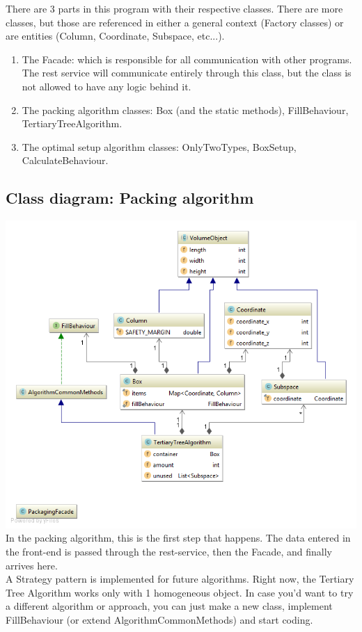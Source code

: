 \documentclass[a4paper,12pt]{article}
\begin{document}
There are 3 parts in this program with their respective classes. There are more classes, but those are referenced in either a general context (Factory classes) or are entities (Column, Coordinate, Subspace, etc...). 
\begin{enumerate}
	\item The Facade: which is responsible for all communication with other programs. The rest service will communicate entirely through this class, but the class is not allowed to have any logic behind it.
	\item The packing algorithm classes: Box (and the static methods), FillBehaviour, TertiaryTreeAlgorithm.
	\item The optimal setup algorithm classes: OnlyTwoTypes, BoxSetup, CalculateBehaviour.
\end{enumerate}

\pagebreak

\subsection{Class diagram: Packing algorithm}
\includegraphics[width=17cm]{Class_diagram_packing_classes2.png}\\
In the packing algorithm, this is the first step that happens. The data entered in the front-end is passed through the rest-service, then the Facade, and finally arrives here. \\

A Strategy pattern is implemented for future algorithms. Right now, the Tertiary Tree Algorithm works only with 1 homogeneous object. In case you'd want to try a different algorithm or approach, you can just make a new class, implement FillBehaviour (or extend AlgorithmCommonMethods) and start coding. \\
\end{document}
